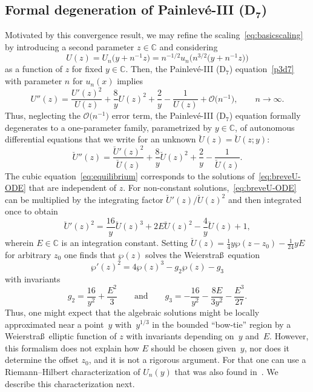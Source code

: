 \documentclass[11pt]{article}
\numberwithin{equation}{section}
\numberwithin{equation}{section}
\begin{document}
\subsection[Formal degeneration of Painlev\'e-III (D\_7)]{Formal degeneration of Painlev\'e-III (D$\boldsymbol{_7}$)}
\label{sec:scaling}
Motivated by this convergence result, we may refine the scaling~\eqref{eq:basicscaling} by introducing a second parameter $z\in\mathbb{C}$ and considering
\begin{equation}
U(z)=U_n\bigl(y+n^{-1}z\bigr)=n^{-1/2}u_n\bigl(n^{3/2}\bigl(y+n^{-1}z\bigr)\bigr)
\label{eq:U-of-z}
\end{equation}
as a function of $z$ for fixed $y\in\mathbb{C}$. Then, the Painlev\'e-III (D$_7$) equation~\eqref{p3d7} with parameter $n$ for $u_n(x)$ implies
\begin{equation*}
U''(z)=\frac{U'(z)^2}{U(z)}+\frac{8}{y}U(z)^2+\frac{2}{y}-\frac{1}{U(z)} +\mathcal{O}\bigl(n^{-1}\bigr),\qquad n\to\infty.
\end{equation*}
Thus, neglecting the $\mathcal{O}\bigl(n^{-1}\bigr)$ error term, the Painlev\'e-III (D$_7$) equation formally degenerates to a one-parameter family, parametrized by $y\in\mathbb{C}$, of autonomous differential equations that we write for an unknown $\breve{U}(z)=\breve{U}(z;y)$:
\begin{equation}
\breve{U}''(z)=\frac{\breve{U}'(z)^2}{\breve{U}(z)}+\frac{8}{y}\breve{U}(z)^2+\frac{2}{y}-\frac{1}{\breve{U}(z)}.
\label{eq:breveU-ODE}
\end{equation}
The cubic equation~\eqref{eq:equilibrium} corresponds to the solutions of~\eqref{eq:breveU-ODE} that are independent of $z$. For non-constant solutions,~\eqref{eq:breveU-ODE} can be multiplied by the integrating factor $\breve{U}'(z)/\breve{U}(z)^2$ and then integrated once to obtain
\begin{equation}
\breve{U}'(z)^2=\frac{16}{y}\breve{U}(z)^3+2E\breve{U}(z)^2-\frac{4}{y}\breve{U}(z)+1,
\label{eq:breveU-first-order}
\end{equation}
wherein $E\in\mathbb{C}$ is an integration constant. Setting $\breve{U}(z)=\frac{1}{4}y\wp(z-z_0)-\frac{1}{24}yE$ for arbitrary $z_0$ one finds that $\wp(z)$ solves the Weierstra\ss\ equation~\cite[Chapter 23]{DLMF}
\begin{equation}
\wp'(z)^2=4\wp(z)^3-g_2\wp(z)-g_3
\label{eq:Weierstrass}
\end{equation}
with invariants
\begin{equation*}
g_2=\frac{16}{y^2}+\frac{E^2}{3}\qquad\text{and}\qquad
g_3=-\frac{16}{y^2}-\frac{8E}{3y^2}-\frac{E^3}{27}.
\end{equation*}
Thus, one might expect that the algebraic solutions might be locally approximated near a point~$y$ with~$y^{1/3}$ in the bounded ``bow-tie'' region by a Weierstra\ss\ elliptic function of $z$ with invariants depending on~$y$ and~$E$. However, this formalism does not explain how $E$ should be chosen given~$y$, nor does it determine the offset $z_0$, and it is not a rigorous argument. For that one can use a Riemann--Hilbert characterization of $U_n(y)$ that was also found in~\cite{BuckinghamM22}. We describe this characterization next.
\end{document}
